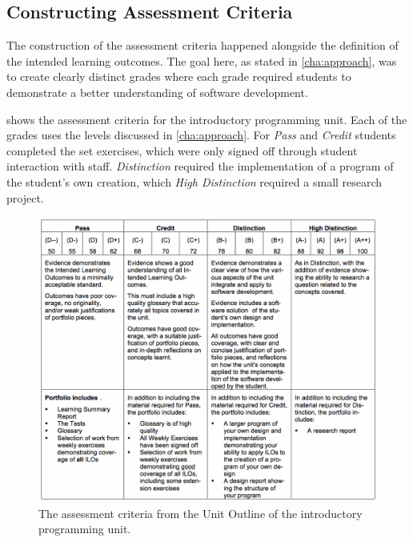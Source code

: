 
\subsection{Constructing Assessment Criteria} %
\label{sub:intro_constructing_assessment_criteria}

The construction of the assessment criteria happened alongside the definition of the intended learning outcomes. The goal here, as stated in \cref{cha:approach}, was to create clearly distinct grades where each grade required students to demonstrate a better understanding of software development. 

 shows the assessment criteria for the introductory programming unit. Each of the grades uses the levels discussed in \cref{cha:approach}. For \emph{Pass} and \emph{Credit} students completed the set exercises, which were only signed off through student interaction with staff. \emph{Distinction} required the implementation of a program of the student's own creation, which \emph{High Distinction} required a small research project.

\begin{figure}[htbp]
	\centering
	\includegraphics[width=\textwidth]{AssessmentCriteria}
	\caption{The assessment criteria from the Unit Outline of the introductory programming unit.}
	\label{fig:assessment_criteria}
\end{figure}

